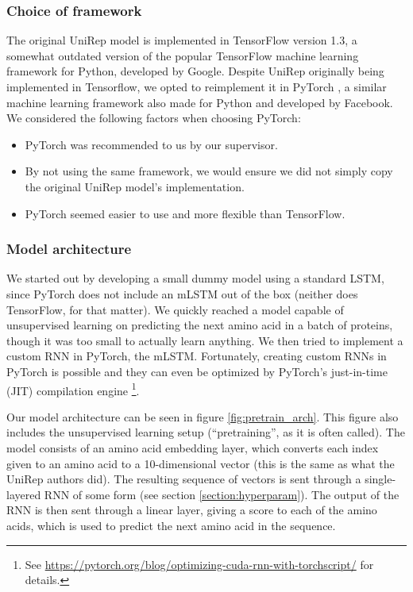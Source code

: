 \documentclass[a4paper,12pt]{article}
\begin{document}
\subsubsection{Choice of framework}
The original UniRep model is implemented in TensorFlow version 1.3, a somewhat outdated version of the popular TensorFlow machine learning framework for Python, developed by Google. Despite UniRep originally being implemented in Tensorflow, we opted to reimplement it in PyTorch \cite{NEURIPS2019_9015}, a similar machine learning framework also made for Python and developed by Facebook. We considered the following factors when choosing PyTorch:
\begin{itemize}
    \item PyTorch was recommended to us by our supervisor.
    \item By not using the same framework, we would ensure we did not simply copy the original UniRep model's implementation.
    \item PyTorch seemed easier to use and more flexible than TensorFlow.
\end{itemize}

\subsubsection{Model architecture}
\label{section:reproduction_architecture}
We started out by developing a small dummy model using a standard LSTM, since PyTorch does not include an mLSTM out of the box (neither does TensorFlow, for that matter). We quickly reached a model capable of unsupervised learning on predicting the next amino acid in a batch of proteins, though it was too small to actually learn anything. We then tried to implement a custom RNN in PyTorch, the mLSTM. Fortunately, creating custom RNNs in PyTorch is possible and they can even be optimized by PyTorch's just-in-time (JIT) compilation engine \footnote{See \url{https://pytorch.org/blog/optimizing-cuda-rnn-with-torchscript/} for details.}.

Our model architecture can be seen in figure \ref{fig:pretrain_arch}. This figure also includes the unsupervised learning setup (``pretraining'', as it is often called). The model consists of an amino acid embedding layer, which converts each index given to an amino acid to a 10-dimensional vector (this is the same as what the UniRep authors did). The resulting sequence of vectors is sent through a single-layered RNN of some form (see section \ref{section:hyperparam}). The output of the RNN is then sent through a linear layer, giving a score to each of the amino acids, which is used to predict the next amino acid in the sequence.
\end{document}
